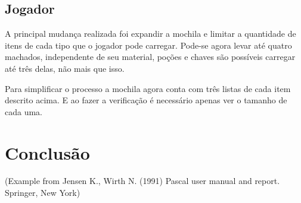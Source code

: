 \documentclass[runningheads,a4paper]{llncs}
\begin{document}
	\subsection{Jogador}
		A principal mudança realizada foi expandir a mochila e limitar a quantidade de itens de cada tipo que o jogador pode carregar. Pode-se agora levar até quatro machados, independente de seu material, poções e chaves são possíveis carregar até três delas, não mais que isso. 
		
		Para simplificar o processo a mochila agora conta com três listas de cada item descrito acima. E ao fazer a verificação é necessário apenas ver o tamanho de cada uma. 

\section{Conclusão}

{\small (Example from Jensen K., Wirth N. (1991) Pascal user manual and
report. Springer, New York)}


\nocite{*} 
\end{document}
